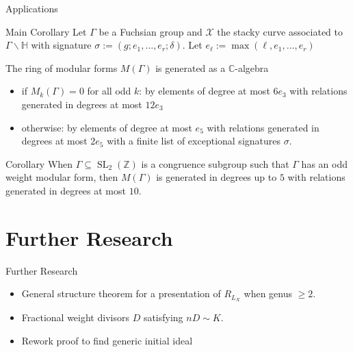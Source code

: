 \documentclass{beamer}
\theoremstyle{remark}
\newcommand\BH{{\mathbb H}}
\newcommand\BC{{\mathbb C}}
\newcommand\BZ{{\mathbb Z}}
\newcommand \sx{{\mathscr X}}
\newcommand{\SL}{\operatorname{SL}}
\begin{document}
\begin{frame}{Applications}
\begin{block}{Main Corollary}
Let $\Gamma$ be a Fuchsian group and $\sx$ the stacky curve
associated to $\Gamma \backslash \BH$ with signature $\sigma
:= (g; e_1, \ldots, e_r; \delta)$. Let $e_\ell := \max(\ell, e_1, \ldots, e_r)$

The ring of modular forms $M(\Gamma)$ is generated as a $\BC$-algebra

\begin{itemize}
\item if $M_k(\Gamma) = 0$ for all odd $k$:
by elements of
degree at most $6 e_3$ with relations
generated in degrees at most $12 e_3$ \\
\end{itemize}

\begin{itemize}
\item otherwise: by elements of degree at most $e_5$ with
relations generated in degrees at most $2 e_5$ with a
finite list of exceptional signatures $\sigma$.
\end{itemize}
\end{block}

\begin{block}{Corollary}
When $\Gamma \subseteq \SL_2(\BZ)$ is a congruence subgroup such
that $\Gamma$ has an odd weight modular form, then $M(\Gamma)$ is
generated in degrees up to $5$ with relations generated in degrees
at most $10$.
\end{block}
\end{frame}

\section{Further Research} 

\begin{frame}{Further Research}
\begin{itemize}
\item General structure theorem for a presentation of $R_{L_X}$ when genus $\ge 2$. \\
\item Fractional weight divisors $D$ satisfying $nD \sim K$. \\
\item Rework proof to find generic initial ideal \\
\end{itemize}

\end{frame}
\end{document}
